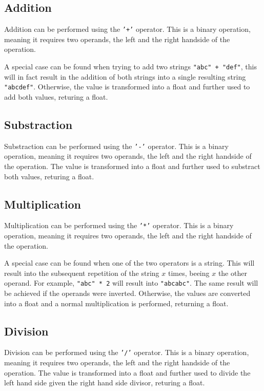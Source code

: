 \subsection{Addition}

Addition can be performed using the \texttt{'+'} operator. This is a binary operation, meaning it requires two operands,
the left and the right handside of the operation.

A special case can be found when trying to add two strings \texttt{"abc" + "def"}, this will in fact result in the addition
of both strings into a single resulting string \texttt{"abcdef"}. Otherwise, the value is transformed into a float and further
used to add both values, returing a float.

\subsection{Substraction}

Substraction can be performed using the \texttt{'-'} operator. This is a binary operation, meaning it requires two operands,
the left and the right handside of the operation.
The value is transformed into a float and further used to substract both values, returing a float.

\subsection{Multiplication}

Multiplication can be performed using the \texttt{'*'} operator. This is a binary operation, meaning it requires two operands,
the left and the right handside of the operation.

A special case can be found when one of the two operators is a string. This will result into the subsequent repetition of the
string $x$ times, beeing $x$ the other operand. For example, \texttt{"abc" * 2} will result into \texttt{"abcabc"}. The same
result will be achieved if the operands were inverted. Otherwise, the values are converted into a float and a normal multiplication
is performed, returning a float.

\subsection{Division}

Division can be performed using the \texttt{'/'} operator. This is a binary operation, meaning it requires two operands,
the left and the right handside of the operation.
The value is transformed into a float and further used to divide the left hand side given the right hand side divisor, returing a float.

